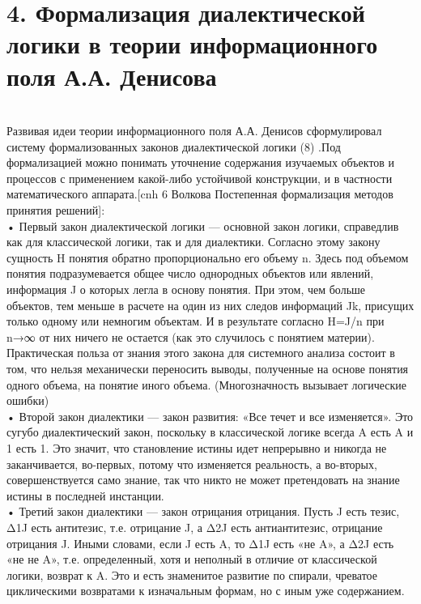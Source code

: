 \documentclass[a4paper,12pt]{report}
\begin{document}
 \chapter*{4. Формализация диалектической логики в теории информационного поля А.А. Денисова }
  \\
 

	Развивая идеи теории информационного поля А.А. Денисов сформулировал систему формализованных законов диалектической логики (8) .Под формализацией можно понимать уточнение содержания изучаемых объектов и процессов с применением какой-либо устойчивой конструкции, и в частности
математического аппарата.[cnh 6 Волкова Постепенная формализация методов принятия решений]:\\
    • Первый закон диалектической логики — основной закон логики, справедлив как для классической логики, так и для диалектики. Согласно этому закону сущность H понятия обратно пропорционально его объему n. Здесь под объемом понятия подразумевается общее число однородных объектов или явлений, информация J о которых легла в основу понятия. При этом, чем больше объектов, тем меньше в расчете на один из них следов информаций Jk, присущих только одному или немногим объектам. И в результате согласно H=J/n при n→∞ от них ничего не остается (как это случилось с понятием материи).
Практическая польза от знания этого закона для системного анализа состоит в том, что нельзя механически переносить выводы, полученные на основе понятия одного объема, на понятие иного объема. (Многозначность вызывает логические ошибки)\\
    • Второй закон диалектики — закон развития: «Все течет и все изменяется». Это сугубо диалектический закон, поскольку в классической логике всегда A есть A и 1 есть 1. Это значит, что становление истины идет непрерывно и никогда не заканчивается, во-первых, потому что изменяется реальность, а во-вторых, совершенствуется само знание, так что никто не может претендовать на знание истины в последней инстанции.\\
    • Третий закон диалектики — закон отрицания отрицания. Пусть J есть тезис, Δ1J есть антитезис, т.е. отрицание J, а Δ2J есть антиантитезис, отрицание отрицания J. Иными словами, если J есть A, то Δ1J есть «не A», а Δ2J есть «не не A», т.е. определенный, хотя и неполный в отличие от классической логики, возврат к A. Это и есть знаменитое развитие по спирали, чреватое циклическими возвратами к изначальным формам, но с иным уже содержанием.\\
\end{document}
